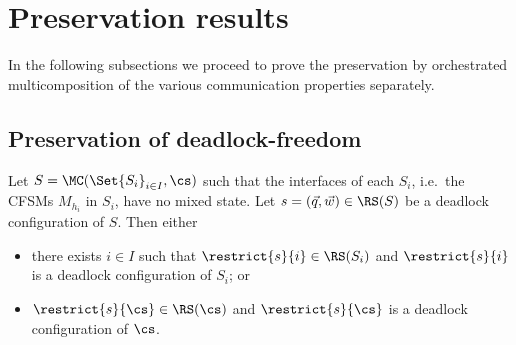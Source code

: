 
\section{Preservation results}
\label{sect:presres}
In the following subsections we proceed to prove the preservation by orchestrated multicomposition of the
various communication properties separately.


\subsection{Preservation of  deadlock-freedom}

\begin{lemma}
\label{lem:weakdfpreservation}
Let $S = \MC(\Set{S_i}_{i\in I}, \cs)$ such that the interfaces of each $S_i$,
i.e.\ the CFSMs $M_{h_i}$ in $S_i$, have no mixed state.
Let $s= (\vec{q},\vec{w}) \in \RS(S)$ be a deadlock configuration of $S$.
Then either 
\begin{itemize}
\item
there exists $i\in I$ such that $\restrict{s}{i}\in \RS(S_i)$ and $\restrict{s}{i}$
is a deadlock configuration of $S_i$; or
\item
$\restrict{s}{\cs}\in \RS(\cs)$ and $\restrict{s}{\cs}$
is a deadlock configuration of $\cs$.
\end{itemize}
\end{lemma}

